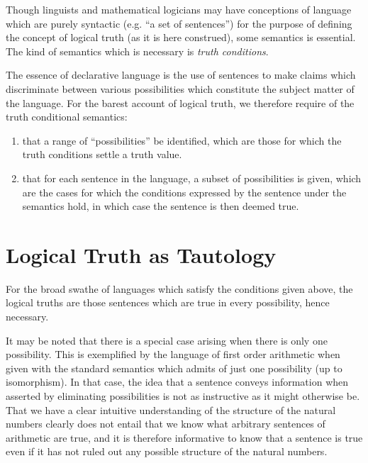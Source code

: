 \documentclass[10pt,titlepage]{book}
\begin{document}
Though linguists and mathematical logicians may have conceptions of language which are purely syntactic (e.g. ``a set of sentences'') for the purpose of defining the concept of logical truth (as it is here construed), some semantics is essential.
The kind of semantics which is necessary is \emph{truth conditions}.

The essence of declarative language is the use of sentences to make claims which discriminate between various possibilities which constitute the subject matter of the language.
For the barest account of logical truth, we therefore require of the truth conditional semantics:

\begin{enumerate}

\item that a range of ``possibilities'' be identified, which are those for which the truth conditions settle a truth value.

\item that for each sentence in the language, a subset of possibilities is given, which are the cases for which the conditions expressed by the sentence under the semantics hold, in which case the sentence is then deemed true.
\end{enumerate}
    
\section{Logical Truth as Tautology}

For the broad swathe of languages which satisfy the conditions given above, the logical truths are those sentences which are true in every possibility, hence necessary.

It may be noted that there is a special case arising when there is only one possibility.
This is exemplified by the language of first order arithmetic when given with the standard semantics which admits of just one possibility (up to isomorphism).
In that case, the idea that a sentence conveys information when asserted by eliminating possibilities is not as instructive as it might otherwise be.
That we have a clear intuitive understanding of the structure of the natural numbers clearly does not entail that we know what arbitrary sentences of arithmetic are true, and it is therefore informative to know that a sentence is true even if it has not ruled out any possible structure of the natural numbers.
\end{document}
